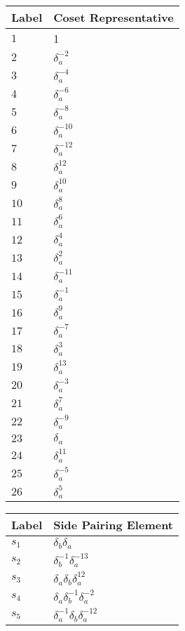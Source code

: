 \documentclass{article}
\begin{document}

\begin{center}
\begin{tabular}{ll}
\toprule
Label & Coset Representative\\
\midrule
$1$ & 1 \\
$2$ & $\delta_a^{-2}$ \\
$3$ & $\delta_a^{-4}$ \\
$4$ & $\delta_a^{-6}$ \\
$5$ & $\delta_a^{-8}$ \\
$6$ & $\delta_a^{-10}$ \\
$7$ & $\delta_a^{-12}$ \\
$8$ & $\delta_a^{12}$ \\
$9$ & $\delta_a^{10}$ \\
$10$ & $\delta_a^{8}$ \\
$11$ & $\delta_a^{6}$ \\
$12$ & $\delta_a^{4}$ \\
$13$ & $\delta_a^{2}$ \\
$14$ & $\delta_a^{-11}$ \\
$15$ & $\delta_a^{-1}$ \\
$16$ & $\delta_a^{9}$ \\
$17$ & $\delta_a^{-7}$ \\
$18$ & $\delta_a^{3}$ \\
$19$ & $\delta_a^{13}$ \\
$20$ & $\delta_a^{-3}$ \\
$21$ & $\delta_a^{7}$ \\
$22$ & $\delta_a^{-9}$ \\
$23$ & $\delta_a^{}$ \\
$24$ & $\delta_a^{11}$ \\
$25$ & $\delta_a^{-5}$ \\
$26$ & $\delta_a^{5}$ \\
\bottomrule
\end{tabular}
\hfill
\begin{tabular}{ll}
\toprule
Label & Side Pairing Element\\
\midrule
$s_{1}$ & $\delta_b^{}\delta_a^{}$ \\
$s_{2}$ & $\delta_b^{-1}\delta_a^{-13}$ \\
$s_{3}$ & $\delta_a^{}\delta_b^{}\delta_a^{12}$ \\
$s_{4}$ & $\delta_a^{}\delta_b^{-1}\delta_a^{-2}$ \\
$s_{5}$ & $\delta_a^{-1}\delta_b^{}\delta_a^{-12}$ \\

\end{tabular}
\end{center}
\end{document}
